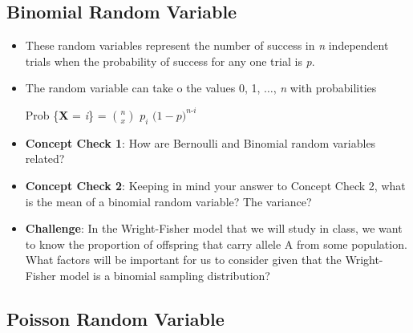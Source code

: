 \documentclass[12pt]{report}
\begin{document}
\bigskip

\bigskip

\bigskip

\bigskip

\bigskip

\bigskip

\bigskip

\subsection{Binomial Random Variable}

\begin{itemize}

\item These random variables represent the number of success in \textit{n} independent trials when the probability of success for any one trial is \textit{p}. 

\item The random variable can take o the values 0, 1, $\ldots$, \textit{n} with probabilities

Prob \{\textbf{X} = \textit{i}\} = ${n \choose x}$ \textit{$p_{i}$} $\big( 1- \textit{p} \big)^{\textit{n-i}}$

\item \textbf{Concept Check 1}: How are Bernoulli and Binomial random variables related?

\bigskip

\bigskip

\bigskip

\item \textbf{Concept Check 2}: Keeping in mind your answer to Concept Check 2, what is the mean of a binomial random variable? The variance?

\bigskip

\bigskip

\bigskip

\item \textbf{Challenge}: In the Wright-Fisher model that we will study in class, we want to know the proportion of offspring that carry allele A from some population. What factors will be important for us to consider given that the Wright-Fisher model is a binomial sampling distribution?

\bigskip

\bigskip

\bigskip

\end{itemize}

\subsection{Poisson Random Variable}
\end{document}

